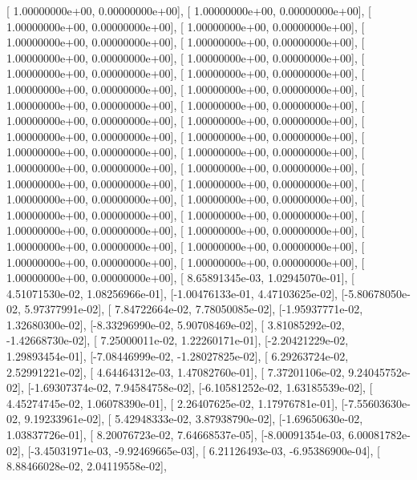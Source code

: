 \documentclass{article}
\begin{document}
       [ 1.00000000e+00,  0.00000000e+00],
       [ 1.00000000e+00,  0.00000000e+00],
       [ 1.00000000e+00,  0.00000000e+00],
       [ 1.00000000e+00,  0.00000000e+00],
       [ 1.00000000e+00,  0.00000000e+00],
       [ 1.00000000e+00,  0.00000000e+00],
       [ 1.00000000e+00,  0.00000000e+00],
       [ 1.00000000e+00,  0.00000000e+00],
       [ 1.00000000e+00,  0.00000000e+00],
       [ 1.00000000e+00,  0.00000000e+00],
       [ 1.00000000e+00,  0.00000000e+00],
       [ 1.00000000e+00,  0.00000000e+00],
       [ 1.00000000e+00,  0.00000000e+00],
       [ 1.00000000e+00,  0.00000000e+00],
       [ 1.00000000e+00,  0.00000000e+00],
       [ 1.00000000e+00,  0.00000000e+00],
       [ 1.00000000e+00,  0.00000000e+00],
       [ 1.00000000e+00,  0.00000000e+00],
       [ 1.00000000e+00,  0.00000000e+00],
       [ 1.00000000e+00,  0.00000000e+00],
       [ 1.00000000e+00,  0.00000000e+00],
       [ 1.00000000e+00,  0.00000000e+00],
       [ 1.00000000e+00,  0.00000000e+00],
       [ 1.00000000e+00,  0.00000000e+00],
       [ 1.00000000e+00,  0.00000000e+00],
       [ 1.00000000e+00,  0.00000000e+00],
       [ 1.00000000e+00,  0.00000000e+00],
       [ 1.00000000e+00,  0.00000000e+00],
       [ 1.00000000e+00,  0.00000000e+00],
       [ 1.00000000e+00,  0.00000000e+00],
       [ 1.00000000e+00,  0.00000000e+00],
       [ 1.00000000e+00,  0.00000000e+00],
       [ 1.00000000e+00,  0.00000000e+00],
       [ 1.00000000e+00,  0.00000000e+00],
       [ 1.00000000e+00,  0.00000000e+00],
       [ 8.65891345e-03,  1.02945070e-01],
       [ 4.51071530e-02,  1.08256966e-01],
       [-1.00476133e-01,  4.47103625e-02],
       [-5.80678050e-02,  5.97377991e-02],
       [ 7.84722664e-02,  7.78050085e-02],
       [-1.95937771e-02,  1.32680300e-02],
       [-8.33296990e-02,  5.90708469e-02],
       [ 3.81085292e-02, -1.42668730e-02],
       [ 7.25000011e-02,  1.22260171e-01],
       [-2.20421229e-02,  1.29893454e-01],
       [-7.08446999e-02, -1.28027825e-02],
       [ 6.29263724e-02,  2.52991221e-02],
       [ 4.64464312e-03,  1.47082760e-01],
       [ 7.37201106e-02,  9.24045752e-02],
       [-1.69307374e-02,  7.94584758e-02],
       [-6.10581252e-02,  1.63185539e-02],
       [ 4.45274745e-02,  1.06078390e-01],
       [ 2.26407625e-02,  1.17976781e-01],
       [-7.55603630e-02,  9.19233961e-02],
       [ 5.42948333e-02,  3.87938790e-02],
       [-1.69650630e-02,  1.03837726e-01],
       [ 8.20076723e-02,  7.64668537e-05],
       [-8.00091354e-03,  6.00081782e-02],
       [-3.45031971e-03, -9.92469665e-03],
       [ 6.21126493e-03, -6.95386900e-04],
       [ 8.88466028e-02,  2.04119558e-02],
\end{document}
